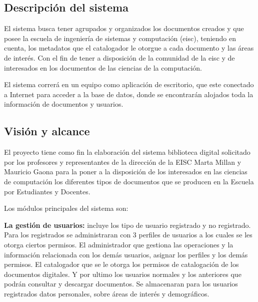 %
%

\subsection{Descripción del sistema}
        El sistema busca tener agrupados y organizados los documentos creados y que posee la
        escuela de ingeniería de sistemas y computación (eisc), teniendo en cuenta, los metadatos
        que el catalogador le otorgue a cada documento y las áreas de interés. Con el fin de tener
        a disposición de la comunidad de la eisc y de interesados en los documentos de las ciencias
        de la computación.
        
        El sistema correrá en un equipo como aplicación de escritorio, que este conectado a 
        Internet para acceder a la base de datos, donde se encontrarán alojados toda la información
        de documentos y usuarios.
        
        \subsection{Visión y alcance}
        El proyecto tiene como fin la elaboración del sistema biblioteca digital solicitado por los
        profesores y representantes de la dirección de la EISC Marta Millan y Mauricio Gaona para
        la poner a la disposición de los interesados en las ciencias de computación los diferentes
        tipos de documentos que se producen en la Escuela por Estudiantes y Docentes.
        
        Los módulos principales del sistema son:
        
        \textbf{La gestión de usuarios:} incluye los tipo de usuario registrado y no registrado.
        Para los registrados se administraran con 3 perfiles de usuarios a los cuales se les otorga
        ciertos permisos. El administrador que gestiona las operaciones y la información 
        relacionada con los demás usuarios, asignar los perfiles y los demás permisos. El 
        catalogador que se le otorga los permisos de catalogación de los documentos digitales. Y
        por ultimo los usuarios normales y los anteriores que podrán consultar y descargar
        documentos. Se almacenaran para los usuarios registrados datos personales, sobre áreas de 
        interés y demográficos.
        
